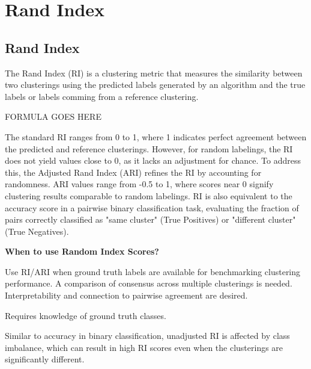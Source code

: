 \clearpage
\thispagestyle{clusteringstyle}
\section{Rand Index}
\subsection{Rand Index}

The Rand Index (RI) is a clustering metric that measures the similarity between two clusterings using the predicted labels generated by an algorithm
and the true labels or labels comming from a reference clustering.

\begin{center}
    FORMULA GOES HERE
\end{center}

The standard RI ranges from 0 to 1, where 1 indicates perfect agreement between the predicted and reference clusterings.
However, for random labelings, the RI does not yield values close to 0, as it lacks an adjustment for chance. To address this,
the Adjusted Rand Index (ARI) refines the RI by accounting for randomness. ARI values range from -0.5 to 1, where scores near 0
signify clustering results comparable to random labelings. RI is also equivalent to the accuracy score in a pairwise binary
classification task, evaluating the fraction of pairs correctly classified as "same cluster" (True Positives) or
"different cluster" (True Negatives).


\textbf{When to use Random Index Scores?}

Use RI/ARI when ground truth labels are available for benchmarking clustering performance. A comparison of consensus across
multiple clusterings is needed. Interpretability and connection to pairwise agreement are desired.

{
    \item Requires knowledge of ground truth classes.
    \item Similar to accuracy in binary classification, unadjusted RI is affected by class imbalance, which can result in high 
    RI scores even when the clusterings are significantly different.
}


